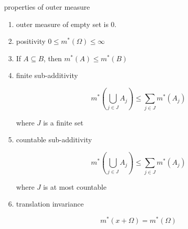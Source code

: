\begin{thm}
    properties of outer measure

    \begin{enumerate}
        \item outer measure of empty set is $0$.

        \item positivity $0 \le m^*(\Omega) \le \infty$

        \item If $A \subseteq B$, then $m^*(A) \le m^*(B)$

        \item finite sub-additivity

        \[
            m^*(\bigcup_{j \in J}A_j) \le \sum_{j \in J}m^*(A_j)
        \]

        where $J$ is a finite set

        \item countable sub-additivity

        \[
            m^*(\bigcup_{j \in J}A_j) \le \sum_{j \in J}m^*(A_j)
        \]

        where $J$ is at most countable

        \item translation invariance

        \[
            m^*(x + \Omega) = m^*(\Omega)
        \]
    \end{enumerate}
\end{thm}

